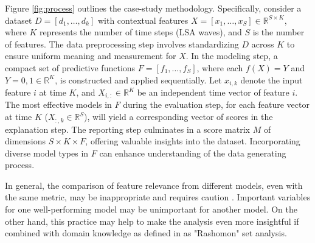 Figure \ref{fig:process} outlines the case-study methodology. Specifically, consider a dataset \( D = [d_1, \ldots, d_k] \) with contextual features \( X = [x_1, \ldots, x_S] \in \mathbb{R}^{S \times K} \), where \( K \) represents the number of time steps (\gls{LSA} waves), and \( S \) is the number of features. The data preprocessing step involves standardizing \( D \) across \( K \) to ensure uniform meaning and measurement for \( X \). In the modeling step, a compact set of predictive functions \( F = [f_1, \ldots, f_S] \), where each \( f(X) = Y \) and \( Y = {0,1} \in \mathbb{R}^K \), is constructed and applied sequentially. Let \( x_{i,k} \) denote the input feature \( i \) at time \( K \), and \( X_{i,:} \in \mathbb{R}^K \) be an independent time vector of feature \( i \). The most effective models in \( F \) during the evaluation step, for each feature vector at time \( K \) (\( X_{:,k} \in \mathbb{R}^S \)), will yield a corresponding vector of scores in the explanation step. The reporting step culminates in a score matrix \( M \) of dimensions \( S \times K \times F \), offering valuable insights into the dataset. Incorporating diverse model types in \( F \) can enhance understanding of the data generating process.

In general, the comparison of feature relevance from different models, even with the same metric, may be inappropriate and requires caution \cite{Fisher2018AllSimultaneously}. Important variables for one well-performing model may be unimportant for another model. On the other hand, this practice may help to make the analysis even more insightful if combined with domain knowledge as defined in \cite{SilvaFilho2023AAchievement} as "Rashomon" set analysis.







